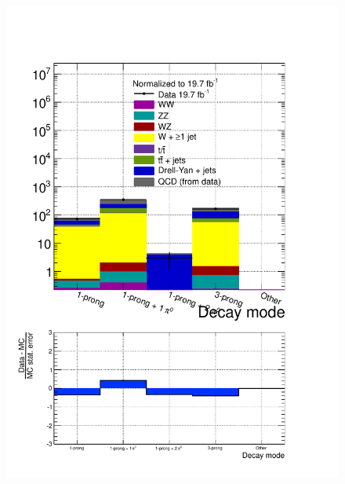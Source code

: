 \begin{figure}[hbtp]
  \begin{center}
    \includegraphics[width=\cmsFigWidth]{figures/dataVsMCQCD_tauHadDecayMode_lowMT_v87}

\end{center}
\end{figure}
